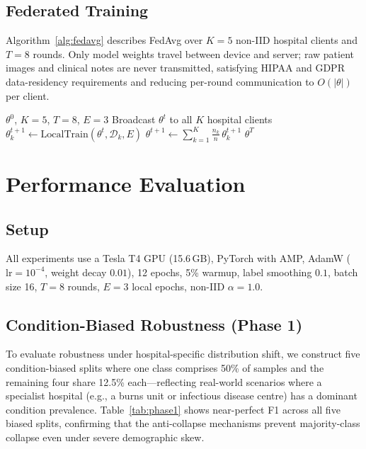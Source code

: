 \documentclass[conference]{IEEEtran}
\begin{document}
\subsection{Federated Training}

Algorithm~\ref{alg:fedavg} describes FedAvg over $K{=}5$ non-IID hospital
clients and $T{=}8$ rounds. Only model weights travel between device and
server; raw patient images and clinical notes are never transmitted,
satisfying HIPAA and GDPR data-residency requirements and reducing
per-round communication to $O(|\theta|)$ per client.

\begin{algorithm}[t]
\caption{MedFederate FedAvg}
\label{alg:fedavg}
\begin{algorithmic}[1]
\REQUIRE $\theta^0$, $K{=}5$, $T{=}8$, $E{=}3$
  \STATE Broadcast $\theta^t$ to all $K$ hospital clients
    \STATE $\theta_k^{t+1} \!\leftarrow\! \mathrm{LocalTrain}(\theta^t,\mathcal{D}_k,E)$
  \ENDFOR
  \STATE $\theta^{t+1} \leftarrow \sum_{k=1}^{K}\tfrac{n_k}{n}\,\theta_k^{t+1}$
\ENDFOR
\RETURN $\theta^T$
\end{algorithmic}
\end{algorithm}

\section{Performance Evaluation}

\subsection{Setup}

All experiments use a Tesla T4 GPU (15.6\,GB), PyTorch with AMP, AdamW
($\text{lr}{=}10^{-4}$, weight decay $0.01$), 12 epochs, 5\% warmup,
label smoothing $0.1$, batch size 16, $T{=}8$ rounds, $E{=}3$ local
epochs, non-IID $\alpha{=}1.0$.

\subsection{Condition-Biased Robustness (Phase 1)}

To evaluate robustness under hospital-specific distribution shift, we
construct five condition-biased splits where one class comprises 50\% of
samples and the remaining four share 12.5\% each---reflecting real-world
scenarios where a specialist hospital (e.g., a burns unit or infectious
disease centre) has a dominant condition prevalence.
Table~\ref{tab:phase1} shows near-perfect F1 across all five biased splits,
confirming that the anti-collapse mechanisms prevent majority-class collapse
even under severe demographic skew.
\end{document}
